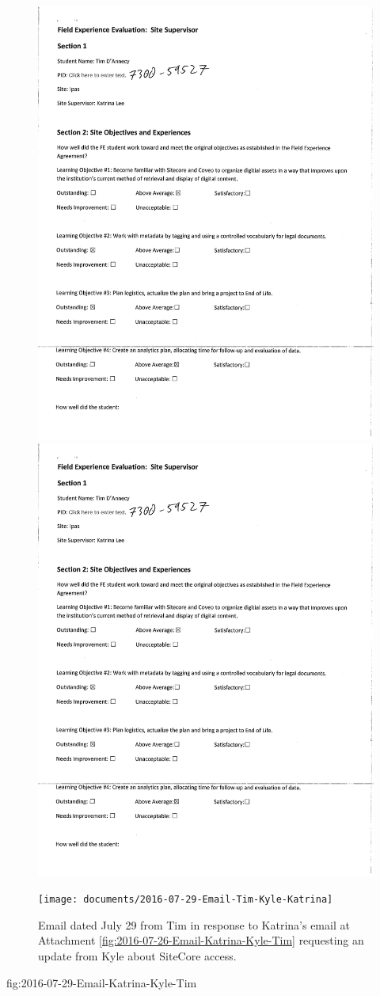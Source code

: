 \begin{figure}
  \centering
    \noindent\includegraphics[page=5,width=.45\textwidth]{documents/2016-07-28-Evaluation-Site-Supervisor} \hfill
    \noindent\includegraphics[page=6,width=.45\textwidth]{documents/2016-07-28-Evaluation-Site-Supervisor}
\end{figure}

\begin{figure}
  \centering
        \noindent\texttt{[image: documents/2016-07-29-Email-Tim-Kyle-Katrina]}
 \caption{Email dated July 29 from Tim in response to Katrina's email at Attachment \ref{fig:2016-07-26-Email-Katrina-Kyle-Tim} requesting an update from Kyle about SiteCore access.}
 \label{fig:2016-07-29-Email-Tim-Kyle-Katrina}
\end{figure}

fig:2016-07-29-Email-Katrina-Kyle-Tim

